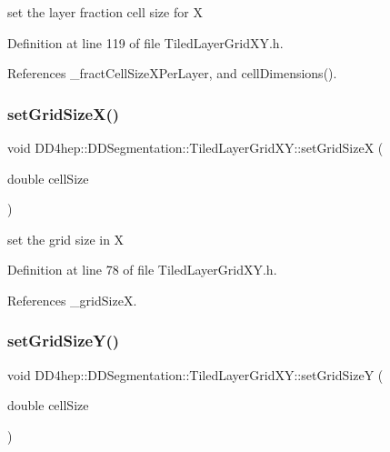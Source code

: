 set the layer fraction cell size for X 



Definition at line 119 of file Tiled\+Layer\+Grid\+X\+Y.\+h.



References \+\_\+fract\+Cell\+Size\+X\+Per\+Layer, and cell\+Dimensions().

\hypertarget{class_d_d4hep_1_1_d_d_segmentation_1_1_tiled_layer_grid_x_y_a183f76f3765e6ab4985b0d6eb024785a}{}\label{class_d_d4hep_1_1_d_d_segmentation_1_1_tiled_layer_grid_x_y_a183f76f3765e6ab4985b0d6eb024785a} 
\subsubsection{\texorpdfstring{set\+Grid\+Size\+X()}{setGridSizeX()}}
{\footnotesize\ttfamily void D\+D4hep\+::\+D\+D\+Segmentation\+::\+Tiled\+Layer\+Grid\+X\+Y\+::set\+Grid\+SizeX (\begin{DoxyParamCaption}\item[{double}]{cell\+Size }\end{DoxyParamCaption})\hspace{0.3cm}{\ttfamily [inline]}}



set the grid size in X 



Definition at line 78 of file Tiled\+Layer\+Grid\+X\+Y.\+h.



References \+\_\+grid\+SizeX.

\hypertarget{class_d_d4hep_1_1_d_d_segmentation_1_1_tiled_layer_grid_x_y_a2556a5e0000580a8ffdf93bde33c36b8}{}\label{class_d_d4hep_1_1_d_d_segmentation_1_1_tiled_layer_grid_x_y_a2556a5e0000580a8ffdf93bde33c36b8} 
\subsubsection{\texorpdfstring{set\+Grid\+Size\+Y()}{setGridSizeY()}}
{\footnotesize\ttfamily void D\+D4hep\+::\+D\+D\+Segmentation\+::\+Tiled\+Layer\+Grid\+X\+Y\+::set\+Grid\+SizeY (\begin{DoxyParamCaption}\item[{double}]{cell\+Size }\end{DoxyParamCaption})\hspace{0.3cm}{\ttfamily [inline]}}



